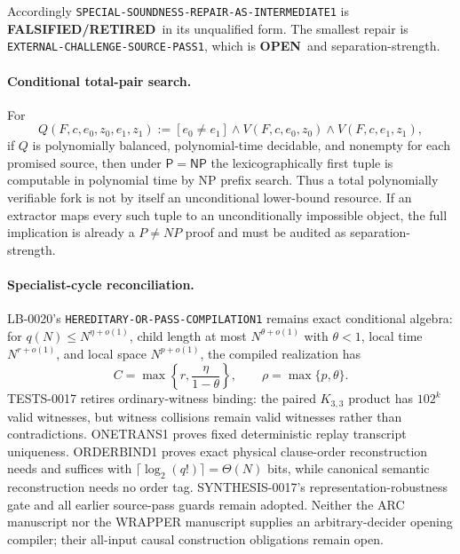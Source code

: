 \documentclass[11pt]{article}
\newcommand{\statusopen}{\textcolor{openstatus}{\textbf{OPEN}}}
\newcommand{\statusretired}{\textcolor{retired}{\textbf{FALSIFIED/RETIRED}}}
\begin{document}
Accordingly \texttt{SPECIAL-SOUNDNESS-REPAIR-AS-INTERMEDIATE1} is
\statusretired\ in its unqualified form.  The smallest repair is
\texttt{EXTERNAL-CHALLENGE-SOURCE-PASS1}, which is \statusopen\ and
separation-strength.

\paragraph{Conditional total-pair search.}
For
\[
 Q(F,c,e_0,z_0,e_1,z_1):=[e_0\ne e_1]\wedge
 V(F,c,e_0,z_0)\wedge V(F,c,e_1,z_1),
\]
if $Q$ is polynomially balanced, polynomial-time decidable, and nonempty for
each promised source, then under $\mathsf P=\mathsf{NP}$ the
lexicographically first tuple is computable in polynomial time by NP prefix
search.  Thus a total polynomially verifiable fork is not by itself an
unconditional lower-bound resource.  If an extractor maps every such tuple to
an unconditionally impossible object, the full implication is already a
$P\ne NP$ proof and must be audited as separation-strength.

\paragraph{Specialist-cycle reconciliation.}
LB-0020's \texttt{HEREDITARY-OR-PASS-COMPILATION1} remains exact conditional
algebra: for $q(N)\le N^{\eta+o(1)}$, child length at most
$N^{\theta+o(1)}$ with $\theta<1$, local time $N^{r+o(1)}$, and local space
$N^{p+o(1)}$, the compiled realization has
\[
 C=\max\left\{r,\frac{\eta}{1-\theta}\right\},
 \qquad \rho=\max\{p,\theta\}.
\]
TESTS-0017 retires ordinary-witness binding: the paired $K_{3,3}$ product has
$102^k$ valid witnesses, but witness collisions remain valid witnesses rather
than contradictions.  ONETRANS1 proves fixed deterministic replay transcript
uniqueness.  ORDERBIND1 proves exact physical clause-order reconstruction
needs and suffices with $\lceil\log_2(q!)\rceil=\Theta(N)$ bits, while
canonical semantic reconstruction needs no order tag.  SYNTHESIS-0017's
representation-robustness gate and all earlier source-pass guards remain
adopted.  Neither the ARC manuscript  nor the WRAPPER
manuscript  supplies an arbitrary-decider opening compiler;
their all-input causal construction obligations remain open.
\end{document}
